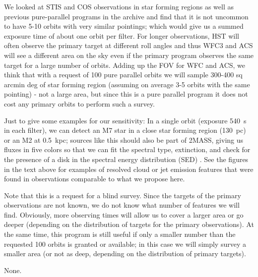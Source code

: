 \documentclass[12pt]{article}
\begin{document}
We looked at STIS and COS observations in star forming regions as well as previous pure-parallel programs in the archive and find that it is not uncommon to have 5-10 orbits with very similar pointings; which would give us a summed exposure time of about one orbit per filter. For longer observations, HST will often observe the primary target at different roll angles and thus WFC3 and ACS will see a different area on the sky even if the primary program observes the same target for a large number of orbits. Adding up the FOV for WFC and ACS, we think that with a request of 100 pure parallel orbits we will sample 300-400 sq arcmin deg of star forming region (assuming on average 3-5 orbits with the same pointing) - not a large area, but since this is a pure parallel program it does not cost any primary orbits to perform such a survey.

Just to give some examples for our sensitivity: In a single orbit (exposure 540~s in each filter), we can detect an M7 star in a close star forming region (130~pc) or an M2 at 0.5~kpc; sources like this should also be part of 2MASS, giving us fluxes in five colors so that we can fit the spectral type, extinction, and check for the presence of a disk in the spectral energy distribution (SED) \citep{2007ApJS..169..328R}.
See the figures in the text above for examples of resolved cloud or jet emission features that were found in observations comparable to what we propose here.

Note that this is a request for a blind survey. Since the targets of the primary observations are not known, we do not know what number of features we will find. Obviously, more observing times will allow us to cover a larger area or go deeper (depending on the distribution of targets for the primary observations). At the same time, this program is still useful if only a smaller number than the requested 100 orbits is granted or available; in this case we will simply survey a smaller area (or not as deep, depending on the distribution of primary targets).




%
%
\specialreq             %
None.

\end{document}
